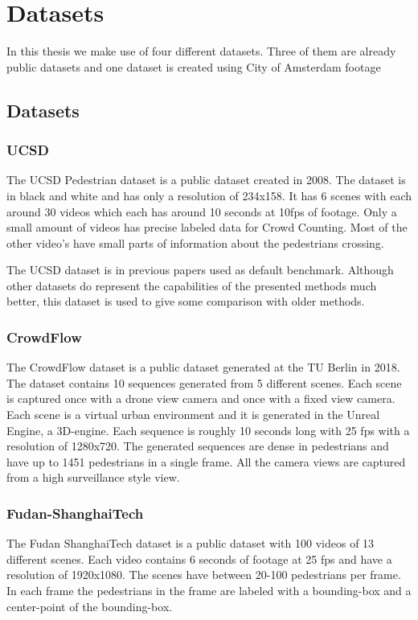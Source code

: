\chapter{Datasets}
In this thesis we make use of four different datasets. Three of them are already public datasets and one dataset is created using City of Amsterdam footage

\section{Datasets}

\subsection{UCSD}
The UCSD Pedestrian dataset \cite{Chan2008} is a public dataset created in 2008. The dataset is in black and white and has only a resolution of 234x158. It has 6 scenes with each around 30 videos which each has around 10 seconds at 10fps of footage. Only a small amount of videos has precise labeled data for Crowd Counting. Most of the other video's have small parts of information about the pedestrians crossing.

The UCSD dataset is in previous papers used as default benchmark. Although other datasets do represent the capabilities of the presented methods much better, this dataset is used to give some comparison with older methods.

\subsection{CrowdFlow}
The CrowdFlow dataset \cite{Schroder2019} is a public dataset generated at the TU Berlin in 2018. The dataset contains 10 sequences generated from 5 different scenes. Each scene is captured once with a drone view camera and once with a fixed view camera. Each scene is a virtual urban environment and it is generated in the Unreal Engine, a 3D-engine. Each sequence is roughly 10 seconds long with 25 fps with a resolution of 1280x720. The generated sequences are dense in pedestrians and have up to 1451 pedestrians in a single frame. All the camera views are captured from a high surveillance style view.

\subsection{Fudan-ShanghaiTech}
The Fudan ShanghaiTech dataset \cite{Fang2019} is a public dataset with 100 videos of 13 different scenes. Each video contains 6 seconds of footage at 25 fps and have a resolution of 1920x1080. The scenes have between 20-100 pedestrians per frame. In each frame the pedestrians in the frame are labeled with a bounding-box and a center-point of the bounding-box.

